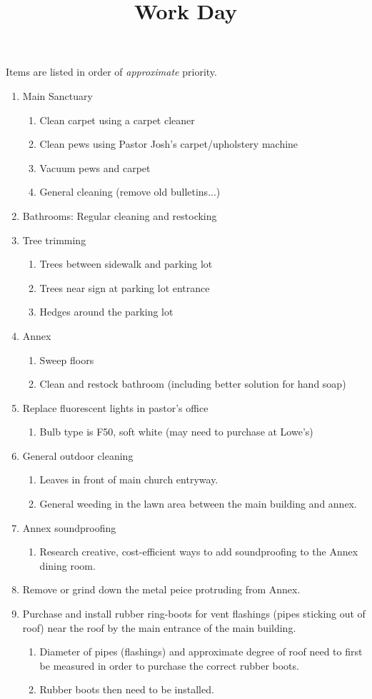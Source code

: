 \documentclass[12pt]{article}
\title{Work Day}
\newcommand{\BI}{\begin{enumerate}\item}
\newcommand{\I}{\item}
\newcommand{\EI}{\end{enumerate}}
\begin{document}
\maketitle
Items are listed in order of \emph{approximate} priority. 
\BI Main Sanctuary
    \BI Clean carpet using a carpet cleaner
    \I  Clean pews using Pastor Josh's carpet/upholstery machine
    \I  Vacuum pews and carpet
    \I  General cleaning (remove old bulletins...) \EI
\I  Bathrooms: Regular cleaning and restocking
\I  Tree trimming
    \BI Trees between sidewalk and parking lot
    \I  Trees near sign at parking lot entrance
    \I  Hedges around the parking lot \EI
\I  Annex
    \BI Sweep floors
    \I  Clean and restock bathroom (including better solution for hand soap) \EI
\I  Replace fluorescent lights in pastor's office
    \BI Bulb type is F50, soft white (may need to purchase at Lowe's) \EI
\I  General outdoor cleaning
    \BI Leaves in front of main church entryway.
    \I  General weeding in the lawn area between the main building and annex. \EI
\I  Annex soundproofing
    \BI Research creative, cost-efficient ways to add soundproofing to the
        Annex dining room. \EI
\I  Remove or grind down the metal peice protruding from Annex.
\I  Purchase and install rubber ring-boots for vent flashings 
    (pipes sticking out of roof) near the roof by the main entrance 
    of the main building.
    \BI Diameter of pipes (flashings) and approximate degree of roof 
        need to first be measured in order to purchase the correct rubber boots.
    \I  Rubber boots then need to be installed. \EI
\EI
\end{document}
